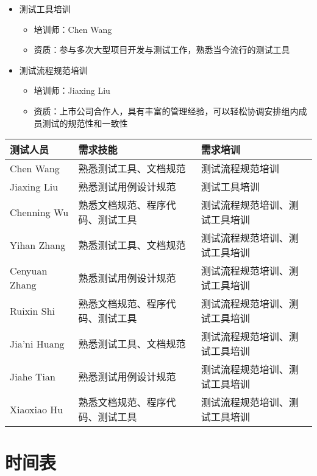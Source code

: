 \documentclass[hyperref, a4paper]{ctexart}
\providecommand{\tightlist}{%
  \setlength{\itemsep}{0pt}\setlength{\parskip}{0pt}}
\begin{document}
\begin{itemize}
\tightlist
\item
  测试工具培训

  \begin{itemize}
  \tightlist
  \item
    培训师：Chen Wang
  \item
    资质：参与多次大型项目开发与测试工作，熟悉当今流行的测试工具
  \end{itemize}
\item
  测试流程规范培训

  \begin{itemize}
  \tightlist
  \item
    培训师：Jiaxing Liu
  \item
    资质：上市公司合作人，具有丰富的管理经验，可以轻松协调安排组内成员测试的规范性和一致性
  \end{itemize}
\end{itemize}

\begin{tabular}{|p{2cm}|p{3.3cm}|p{8cm}|}
\hline
测试人员 & 需求技能 & 需求培训\\
\hline
Chen Wang & 熟悉测试工具、文档规范 & 测试流程规范培训\\
\hline
Jiaxing Liu & 熟悉测试用例设计规范 & 测试工具培训\\
\hline
Chenning Wu & 熟悉文档规范、程序代码、测试工具 & 测试流程规范培训、测试工具培训\\
\hline
Yihan Zhang & 熟悉测试工具、文档规范 & 测试流程规范培训、测试工具培训\\
\hline
Cenyuan Zhang & 熟悉测试用例设计规范 & 测试流程规范培训、测试工具培训\\
\hline
Ruixin Shi & 熟悉文档规范、程序代码、测试工具 & 测试流程规范培训、测试工具培训\\
\hline
Jia'ni Huang & 熟悉测试工具、文档规范 & 测试流程规范培训、测试工具培训\\
\hline
Jiahe Tian & 熟悉测试用例设计规范 & 测试流程规范培训、测试工具培训\\
\hline
Xiaoxiao Hu & 熟悉文档规范、程序代码、测试工具 & 测试流程规范培训、测试工具培训\\
\hline
\end{tabular}

\hypertarget{ux65f6ux95f4ux8868}{%
\section{时间表}\label{ux65f6ux95f4ux8868}}
\end{document}
